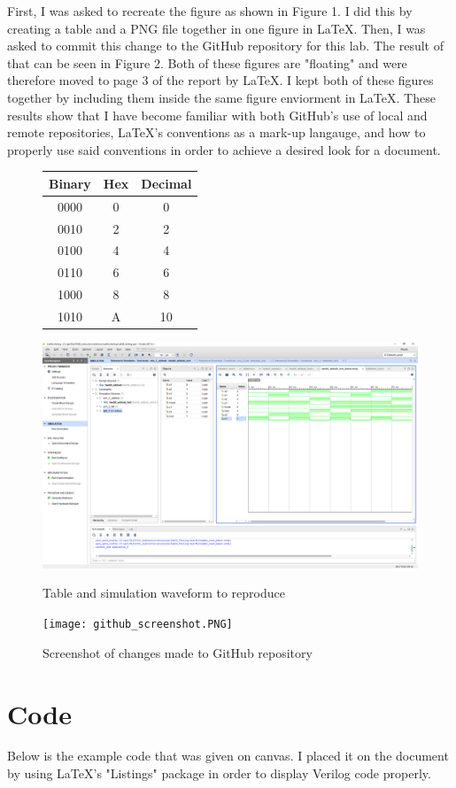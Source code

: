 \documentclass[11pt]{article}
\newcommand{\Verilog}[2][]{%
	
}
\begin{document}
First, I was asked to recreate the figure as shown in Figure 1. I did this by creating a table and a PNG file together in one figure in LaTeX. Then, I was asked to commit this change to the GitHub repository for this lab. The result of that can be seen in Figure 2. Both of these figures are "floating" and were therefore moved to page 3 of the report by LaTeX. I kept both of these figures together by including them inside the same figure enviorment in LaTeX. These results show that I have become familiar with both GitHub's use of local and remote repositories, LaTeX's conventions as a mark-up langauge, and how to properly use said conventions in order to achieve a desired look for a document.

\begin{figure}[ht]\centering
	\begin{tabular}{c|c|c}
		\toprule Binary & Hex & Decimal \\
		\midrule
		0000 & 0 & 0 \\
		0010 & 2 & 2 \\
		0100 & 4 & 4 \\
		0110 & 6 & 6 \\
		1000 & 8 & 8 \\
		1010 & A & 10\\
		\bottomrule
	\end{tabular}\medskip

	\includegraphics[width=1\textwidth, trim=18.5cm 15.5cm 0.55cm 4.5cm, clip]{lab1_example_screenshot.PNG}
	\caption{Table and simulation waveform to reproduce}
	
	\texttt{[image: github\_screenshot.PNG]}
	\caption{Screenshot of changes made to GitHub repository}
\end{figure}


\section*{Code}

Below is the example code that was given on canvas. I placed it on the document by using LaTeX's "Listings" package in order to display Verilog code properly.

\Verilog[caption=Example Code from Canvas]{lab1_example_code.sv}
\end{document}
